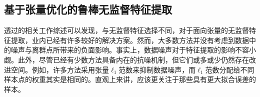 

\subsection{基于张量优化的鲁棒无监督特征提取}
透过的相关工作综述可以发现，与无监督特征选择不同，对于面向张量的无监督特征提取，业内已经有许多较好的解决方案。然而，大多数方法并没有考虑到数据中的噪声与离群点所带来的负面影响。事实上，数据噪声对于特征提取的影响不容小觑。此外，尽管已经有少数方法具备内在的抗噪机制，但它们或多或少仍然存在改进空间。例如，许多方法采用张量$\ell_{1}$范数来抑制数据噪声，而$\ell_{1}$范数分配给不同样本点的权重其实是相同的。直观上来讲，应该更关注于那些具有更大拟合误差的样本。

